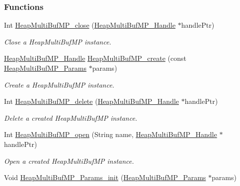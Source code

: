 \subsubsection*{Functions}
\begin{DoxyCompactItemize}
\item 
Int \hyperlink{_heap_multi_buf_m_p_8h_a267f6b50f05a5c859ac38d207020381e}{HeapMultiBufMP\_\-close} (\hyperlink{_heap_multi_buf_m_p_8h_a84a0dbef1eb25a19072649a3c30ed4e6}{HeapMultiBufMP\_\-Handle} $\ast$handlePtr)
\begin{DoxyCompactList}\small\item\em Close a HeapMultiBufMP instance. \item\end{DoxyCompactList}\item 
\hyperlink{_heap_multi_buf_m_p_8h_a84a0dbef1eb25a19072649a3c30ed4e6}{HeapMultiBufMP\_\-Handle} \hyperlink{_heap_multi_buf_m_p_8h_a76b4a6dc8007ad99b598aa5a64b0d955}{HeapMultiBufMP\_\-create} (const \hyperlink{struct_heap_multi_buf_m_p___params}{HeapMultiBufMP\_\-Params} $\ast$params)
\begin{DoxyCompactList}\small\item\em Create a HeapMultiBufMP instance. \item\end{DoxyCompactList}\item 
Int \hyperlink{_heap_multi_buf_m_p_8h_aaa779c5601feba3b7519345823d0df7e}{HeapMultiBufMP\_\-delete} (\hyperlink{_heap_multi_buf_m_p_8h_a84a0dbef1eb25a19072649a3c30ed4e6}{HeapMultiBufMP\_\-Handle} $\ast$handlePtr)
\begin{DoxyCompactList}\small\item\em Delete a created HeapMultiBufMP instance. \item\end{DoxyCompactList}\item 
Int \hyperlink{_heap_multi_buf_m_p_8h_a0fe88a611f390024e0772876546084cc}{HeapMultiBufMP\_\-open} (String name, \hyperlink{_heap_multi_buf_m_p_8h_a84a0dbef1eb25a19072649a3c30ed4e6}{HeapMultiBufMP\_\-Handle} $\ast$handlePtr)
\begin{DoxyCompactList}\small\item\em Open a created HeapMultiBufMP instance. \item\end{DoxyCompactList}\item 
Void \hyperlink{_heap_multi_buf_m_p_8h_a0a3a33f3e29e6f78623ec7cb89d2c3a4}{HeapMultiBufMP\_\-Params\_\-init} (\hyperlink{struct_heap_multi_buf_m_p___params}{HeapMultiBufMP\_\-Params} $\ast$params)

\end{DoxyCompactItemize}
